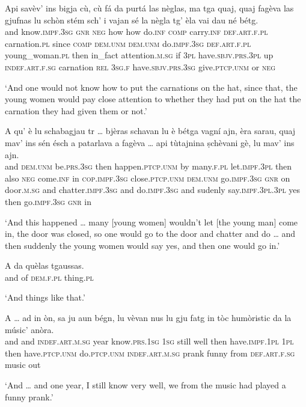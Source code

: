\begin{linenumbers}
	\gll    Api savèv’ ins bigja cù, cù fá da purtá las nèglas, ma tga quaj, quaj fagèva las gjufnas lu schòn stém sch’ i vajan sé la nègla tg’ èla vai dau né bétg.\\
	and know.\textsc{impf.3sg} \textsc{gnr} \textsc{neg} how how do.\textsc{inf} \textsc{comp} carry.\textsc{inf} \textsc{def.art.f.pl} carnation.\textsc{pl} since \textsc{comp} \textsc{dem.unm} \textsc{dem.unm} do.\textsc{impf.3sg} \textsc{def.art.f.pl} young\_woman.\textsc{pl} then in\_fact attention.\textsc{m.sg} if \textsc{3pl}  have.\textsc{sbjv.prs.3pl} up \textsc{indef.art.f.sg} carnation \textsc{rel} \textsc{3sg.f} have.\textsc{sbjv.prs.3sg}  give.\textsc{ptcp.unm} or \textsc{neg} \\
\end{linenumbers}
\medskip
\glt `And one would not know how to put the carnations on the hat, since that, the young women would pay close attention to whether they had put on the hat the carnation they had given them or not.'
\medskip

\begin{linenumbers}
	\gll    A qu’ è lu schabagjau tr … bjèras schavan lu è bétga vagní ajn, èra sarau, quaj mav’ ins sén ésch a patarlava a fagèva … api tùtajnina ṣchèvani gè, lu mav’ ins ajn.\\
	and \textsc{dem.unm} be.\textsc{prs.3sg} then happen.\textsc{ptcp.unm} by {} many.\textsc{f.pl}  let.\textsc{impf.3pl} then also \textsc{neg} come.\textsc{inf} in  \textsc{cop.impf.3sg} close.\textsc{ptcp.unm} \textsc{dem.unm} go.\textsc{impf.3sg} \textsc{gnr} on  door.\textsc{m.sg} and chatter.\textsc{impf.3sg} and do.\textsc{impf.3sg} {} and sudenly say.\textsc{impf.3pl.3pl} yes then  go.\textsc{impf.3sg} \textsc{gnr} in\\
\end{linenumbers}
\medskip
\glt `And this happened … many [young women] wouldn’t let [the young man] come in, the door was closed, so one would go to the door and chatter  and do … and then suddenly the young women would say yes, and then one would go in.'
\medskip

\begin{linenumbers}
	\gll    A da quèlas tgaussas.\\
	and of \textsc{dem.f.pl} thing.\textsc{pl}\\
\end{linenumbers}
\medskip
\glt `And things like that.'
\medskip

\begin{linenumbers}
	\gll    A … ad in òn, sa ju aun bégn, lu vèvan nus lu gju fatg in tòc humòristic  da la músic’ anòra.\\
	and {} and  \textsc{indef.art.m.sg} year know.\textsc{prs.1sg} \textsc{1sg} still well then have.\textsc{impf.1pl} \textsc{1pl} then have.\textsc{ptcp.unm} do.\textsc{ptcp.unm} \textsc{indef.art.m.sg} prank funny from \textsc{def.art.f.sg} music out\\
\end{linenumbers}
\medskip
\glt `And … and one year, I still know very well, we from the music had played a funny prank.'
\medskip

